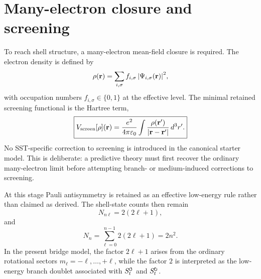 \documentclass[11pt,a4paper]{article}
\newcommand{\swirlarrow}{\mathchoice{\mkern-2mu\scriptstyle\boldsymbol{\circlearrowleft}}{\mkern-2mu\scriptstyle\boldsymbol{\circlearrowleft}}{\mkern-2mu\scriptscriptstyle\boldsymbol{\circlearrowleft}}{\mkern-2mu\scriptscriptstyle\boldsymbol{\circlearrowleft}}}
\newcommand{\swirlarrowcw}{\mathchoice{\mkern-2mu\scriptstyle\boldsymbol{\circlearrowright}}{\mkern-2mu\scriptstyle\boldsymbol{\circlearrowright}}{\mkern-2mu\scriptscriptstyle\boldsymbol{\circlearrowright}}{\mkern-2mu\scriptscriptstyle\boldsymbol{\circlearrowright}}}
\newcommand{\SwirlClock}{S_t^{\swirlarrow}}
\newcommand{\SwirlClockcw}{S_t^{\swirlarrowcw}}
\begin{document}
\section{Many-electron closure and screening}
To reach shell structure, a many-electron mean-field closure is required. The electron density is defined by
\begin{equation}
\label{eq:rho-def}
\rho(\mathbf r)=\sum_{i,\sigma} f_{i,\sigma}\,\abs{\Psi_{i,\sigma}(\mathbf r)}^2,
\end{equation}
with occupation numbers $f_{i,\sigma}\in\{0,1\}$ at the effective level. The minimal retained screening functional is the Hartree term,
\begin{equation}
\label{eq:Vscreen}
\boxed{
V_{\rm screen}[\rho](\mathbf r)
=
\frac{e^2}{4\pi\varepsilon_0}
\int \frac{\rho(\mathbf r')}{\abs{\mathbf r-\mathbf r'}}\,d^3r'.
}
\end{equation}
No SST-specific correction to screening is introduced in the canonical starter model. This is deliberate: a predictive theory must first recover the ordinary many-electron limit before attempting branch- or medium-induced corrections to screening.

At this stage Pauli antisymmetry is retained as an effective low-energy rule rather than claimed as derived. The shell-state counts then remain
\begin{equation}
\label{eq:subshell-count}
N_{n\ell}=2(2\ell+1),
\end{equation}
and
\begin{equation}
\label{eq:shell-count}
N_n=\sum_{\ell=0}^{n-1}2(2\ell+1)=2n^2.
\end{equation}
In the present bridge model, the factor $2\ell+1$ arises from the ordinary rotational sectors $m_\ell=-\ell,\ldots,+\ell$, while the factor $2$ is interpreted as the low-energy branch doublet associated with $\SwirlClock$ and $\SwirlClockcw$.
\end{document}
